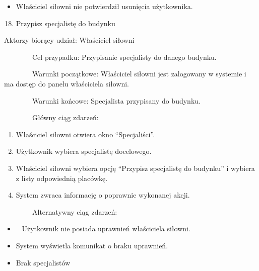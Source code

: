 \documentclass[
]{article}
\providecommand{\tightlist}{%
  \setlength{\itemsep}{0pt}\setlength{\parskip}{0pt}}
\begin{document}
\begin{itemize}
\tightlist
\item
  {Właściciel siłowni nie potwierdził usunięcia użytkownika. }
\end{itemize}

{}

{}

\begin{enumerate}
\setcounter{enumi}{17}
\tightlist
\item
  {Przypisz specjalistę do budynku}
\end{enumerate}

{Aktorzy biorący udział: Właściciel siłowni}

{~~~~~~~~Cel przypadku: Przypisanie specjalisty do danego budynku.}

{~~~~~~~~Warunki początkowe: Właściciel siłowni jest zalogowany w
systemie i ma dostęp do panelu właściciela siłowni.}

{~~~~~~~~Warunki końcowe: Specjalista przypisany do budynku.}

{~~~~~~~~Główny ciąg zdarzeń:}

\begin{enumerate}
\tightlist
\item
  {Właściciel siłowni otwiera okno ``Specjaliści''.}
\item
  {Użytkownik wybiera specjalistę docelowego.}
\item
  {Właściciel siłowni wybiera opcję ``Przypisz specjalistę do budynku''
  i wybiera z listy odpowiednią placówkę.}
\item
  {System zwraca informację o poprawnie wykonanej akcji.}
\end{enumerate}

{~~~~~~~~Alternatywny ciąg zdarzeń:}

\begin{itemize}
\tightlist
\item
  {~ Użytkownik nie posiada uprawnień właściciela siłowni.}
\end{itemize}

\begin{itemize}
\tightlist
\item
  {System wyświetla komunikat o braku uprawnień.}
\end{itemize}

\begin{itemize}
\tightlist
\item
  {Brak specjalistów}
\end{itemize}
\end{document}
